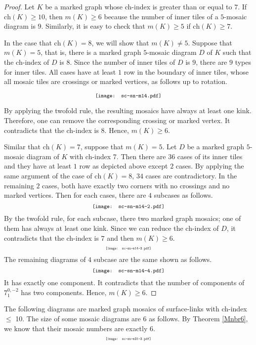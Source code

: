 \documentclass{article}
\theoremstyle{definition}
\begin{document}
\begin{proof}
Let $K$ be a marked graph whose ch-index is greater than or equal to $7$.
If $\mathrm{ch}(K)\geq 10$, then $m(K)\geq 6$ because the number of inner tiles of a $5$-mosaic diagram is $9$.
Similarly, it is easy to check that $m(K)\geq 5$ if $\mathrm{ch}(K)\geq 7$.

In the case that $\mathrm{ch}(K)=8$, we will show that $m(K)\ne 5$.
Suppose that $m(K)=5$, that is, there is a marked graph $5$-mosaic diagram $D$ of $K$ such that the ch-index of $D$ is $8$.
Since the number of inner tiles of $D$ is $9$, there are $9$ types for inner tiles.
All cases have at least $1$ row in the boundary of inner tiles, whose all mosaic tiles are crossings or marked vertices, as follows up to rotation.

\[\scalebox{0.8}{\texttt{[image: sc-sn-m14.pdf]}}\]

By applying the twofold rule, the resulting mosaics have always at least one kink. Therefore, one can remove the corresponding crossing or marked vertex. 
It contradicts that the ch-index is $8$. 
Hence, $m(K)\geq 6$.

Similar that $\mathrm{ch}(K)=7$, suppose that $m(K)=5$.
Let $D$ be a marked graph $5$-mosaic diagram of $K$ with ch-index $7$.
Then there are $36$ cases of its inner tiles and they have at least $1$ row as depicted above except $2$ cases. By applying the same argument of the case of $\mathrm{ch}(K)=8$, $34$ cases are contradictory. 
In the remaining $2$ cases, both have exactly two corners with no crossings and no marked vertices. Then for each cases, there are $4$ subcases as follows.
\[\scalebox{0.8}{\texttt{[image: sc-sn-m14-2.pdf]}}\]
By the twofold rule, for each subcase, there two marked graph mosaics; one of them has always at least one kink. Since we can reduce the ch-index of $D$, it contradicts that the ch-index is $7$ and then $m(K)\geq 6$.
\[\scalebox{0.5}{\texttt{[image: sc-sn-m14-3.pdf]}}\]
The remaining diagrams of $4$ subcase are the same shown as follows. 
\[\scalebox{0.8}{\texttt{[image: sc-sn-m14-4.pdf]}}\]
It has exactly one component. It contradicts that the number of components of $7_{1}^{0,-2}$ has two components. Hence, $m(K)\geq 6$.
\end{proof}


The following diagrams are marked graph mosaics of surface-links with ch-index $\leq$ 10. The size of some mosaic diagrams are $6$ as follows. By Theorem \ref{Mnbr6}, we know that their mosaic numbers are exactly $6$.
\[\scalebox{0.5}{\texttt{[image: sc-sn-m31-3.pdf]}}\]
\end{document}
